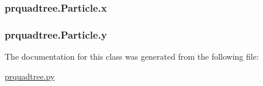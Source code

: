 \subsubsection[{x}]{\setlength{\rightskip}{0pt plus 5cm}prquadtree.\+Particle.\+x}\label{classprquadtree_1_1Particle_a749ee47de3358225c48e7b8d4dc85ded}
\subsubsection[{y}]{\setlength{\rightskip}{0pt plus 5cm}prquadtree.\+Particle.\+y}\label{classprquadtree_1_1Particle_ab4bcb8c94d6976d2050749590ad41210}


The documentation for this class was generated from the following file\+:\begin{DoxyCompactItemize}
\item 
\hyperlink{prquadtree_8py}{prquadtree.\+py}\end{DoxyCompactItemize}
